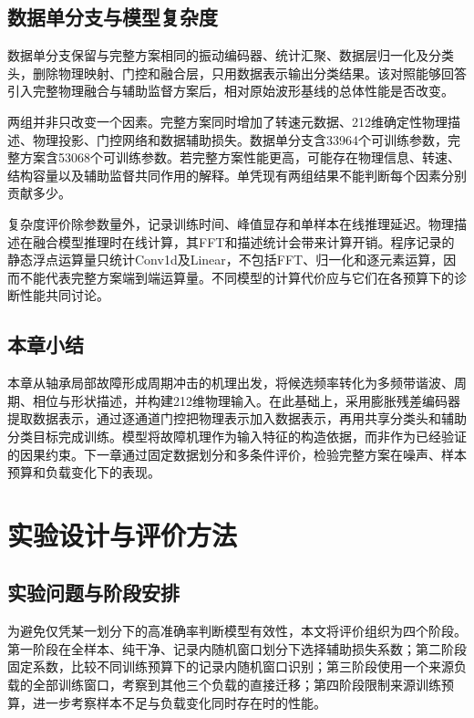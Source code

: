 \documentclass[UTF8,12pt,openany,twoside]{ctexbook}
\numberwithin{equation}{chapter}
\begin{document}
\section{数据单分支与模型复杂度}\label{ux6570ux636eux5355ux5206ux652fux4e0eux6a21ux578bux590dux6742ux5ea6}

数据单分支保留与完整方案相同的振动编码器、统计汇聚、数据层归一化及分类头，删除物理映射、门控和融合层，只用数据表示输出分类结果。该对照能够回答引入完整物理融合与辅助监督方案后，相对原始波形基线的总体性能是否改变。

两组并非只改变一个因素。完整方案同时增加了转速元数据、212维确定性物理描述、物理投影、门控网络和数据辅助损失。数据单分支含33964个可训练参数，完整方案含53068个可训练参数。若完整方案性能更高，可能存在物理信息、转速、结构容量以及辅助监督共同作用的解释。单凭现有两组结果不能判断每个因素分别贡献多少。

复杂度评价除参数量外，记录训练时间、峰值显存和单样本在线推理延迟。物理描述在融合模型推理时在线计算，其FFT和描述统计会带来计算开销。程序记录的静态浮点运算量只统计Conv1d及Linear，不包括FFT、归一化和逐元素运算，因而不能代表完整方案端到端运算量。不同模型的计算代价应与它们在各预算下的诊断性能共同讨论。

\section{本章小结}\label{ux672cux7ae0ux5c0fux7ed3-1}

本章从轴承局部故障形成周期冲击的机理出发，将候选频率转化为多频带谐波、周期、相位与形状描述，并构建212维物理输入。在此基础上，采用膨胀残差编码器提取数据表示，通过逐通道门控把物理表示加入数据表示，再用共享分类头和辅助分类目标完成训练。模型将故障机理作为输入特征的构造依据，而非作为已经验证的因果约束。下一章通过固定数据划分和多条件评价，检验完整方案在噪声、样本预算和负载变化下的表现。

\chapter{实验设计与评价方法}\label{ux7b2c4ux7ae0-ux5b9eux9a8cux8bbeux8ba1ux4e0eux8bc4ux4ef7ux65b9ux6cd5}

\section{实验问题与阶段安排}\label{ux5b9eux9a8cux95eeux9898ux4e0eux9636ux6bb5ux5b89ux6392}

为避免仅凭某一划分下的高准确率判断模型有效性，本文将评价组织为四个阶段。第一阶段在全样本、纯干净、记录内随机窗口划分下选择辅助损失系数；第二阶段固定系数，比较不同训练预算下的记录内随机窗口识别；第三阶段使用一个来源负载的全部训练窗口，考察到其他三个负载的直接迁移；第四阶段限制来源训练预算，进一步考察样本不足与负载变化同时存在时的性能。
\end{document}
